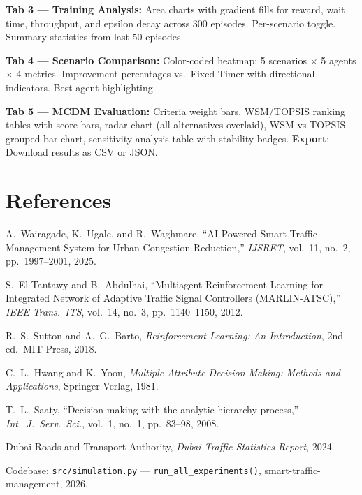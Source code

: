 \documentclass[11pt, a4paper]{article}
\begin{document}
\textbf{Tab 3 --- Training Analysis:} Area charts with gradient fills for reward, wait time, throughput, and epsilon decay across 300 episodes. Per-scenario toggle. Summary statistics from last 50 episodes.

\textbf{Tab 4 --- Scenario Comparison:} Color-coded heatmap: 5 scenarios $\times$ 5 agents $\times$ 4 metrics. Improvement percentages vs.\ Fixed Timer with directional indicators. Best-agent highlighting.

\textbf{Tab 5 --- MCDM Evaluation:} Criteria weight bars, WSM/TOPSIS ranking tables with score bars, radar chart (all alternatives overlaid), WSM vs TOPSIS grouped bar chart, sensitivity analysis table with stability badges. \textbf{Export}: Download results as CSV or JSON.

\section*{References}

\begin{enumerate}[nosep, leftmargin=*, label={[\arabic*]}]
    \item A.~Wairagade, K.~Ugale, and R.~Waghmare, ``AI-Powered Smart Traffic Management System for Urban Congestion Reduction,'' \textit{IJSRET}, vol.~11, no.~2, pp.~1997--2001, 2025.
    \item S.~El-Tantawy and B.~Abdulhai, ``Multiagent Reinforcement Learning for Integrated Network of Adaptive Traffic Signal Controllers (MARLIN-ATSC),'' \textit{IEEE Trans.\ ITS}, vol.~14, no.~3, pp.~1140--1150, 2012.
    \item R.~S.~Sutton and A.~G.~Barto, \textit{Reinforcement Learning: An Introduction}, 2nd ed.\ MIT Press, 2018.
    \item C.~L.~Hwang and K.~Yoon, \textit{Multiple Attribute Decision Making: Methods and Applications}, Springer-Verlag, 1981.
    \item T.~L.~Saaty, ``Decision making with the analytic hierarchy process,'' \textit{Int.\ J.\ Serv.\ Sci.}, vol.~1, no.~1, pp.~83--98, 2008.
    \item Dubai Roads and Transport Authority, \textit{Dubai Traffic Statistics Report}, 2024.
    \item Codebase: \texttt{src/simulation.py} --- \texttt{run\_all\_experiments()}, smart-traffic-management, 2026.
\end{enumerate}
\end{document}
